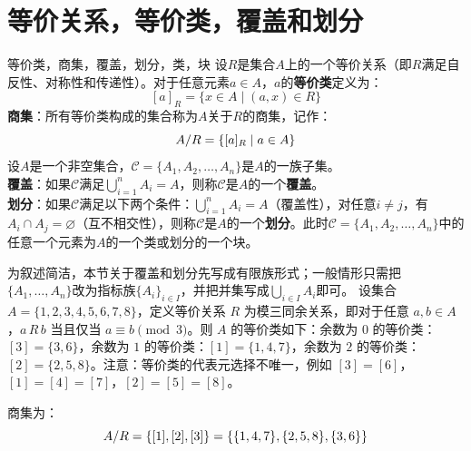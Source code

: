 \section{等价关系，等价类，覆盖和划分}
\begin{definition}{等价类，商集，覆盖，划分，类，块}{}
设$R$是集合$A$上的一个等价关系（即$R$满足自反性、对称性和传递性）。对于任意元素$a \in A$，$a$的\textbf{等价类}定义为：\vspace{-10pt}
\[
[a]_R = \{x \in A \mid (a,x) \in R\}
\]
\textbf{商集}：所有等价类构成的集合称为$A$关于$R$的商集，记作：\vspace{-5pt}
\[
A/R = \{[a]_R \mid a \in A\}\vspace{-5pt}
\]
设$A$是一个非空集合，$\mathcal{C} = \{A_1, A_2, \ldots, A_n\}$是$A$的一族子集。\\
\textbf{覆盖}：如果$\mathcal{C}$满足$\bigcup_{i=1}^{n} A_i = A$，则称$\mathcal{C}$是$A$的一个\textbf{覆盖}。\\
\textbf{划分}：如果$\mathcal{C}$满足以下两个条件：$\bigcup_{i=1}^{n} A_i = A$（覆盖性），对任意$i \neq j$，有$A_i \cap A_j = \varnothing$（互不相交性），则称$\mathcal{C}$是$A$的一个\textbf{划分}。此时$\mathcal{C} = \{A_1, A_2, \ldots, A_n\}$中的任意一个元素为$A$的一个类或划分的一个块。
\end{definition}
为叙述简洁，本节关于覆盖和划分先写成有限族形式；一般情形只需把$\{A_1,\ldots,A_n\}$改为指标族$\{A_i\}_{i\in I}$，并把并集写成$\bigcup_{i\in I}A_i$即可。
设集合 $A = \{1, 2, 3, 4, 5, 6, 7, 8\}$，定义等价关系 $R$ 为模三同余关系，即对于任意 $a, b \in A$，$a \, R \, b$ 当且仅当 $a \equiv b \pmod{3}$。则 $A$ 的等价类如下：余数为 $0$ 的等价类：$[3] = \{3, 6\}$，余数为 $1$ 的等价类：$[1] = \{1, 4, 7\}$，余数为 $2$ 的等价类：$[2] = \{2, 5, 8\}$。注意：等价类的代表元选择不唯一，例如 $[3] = [6]$，$[1] = [4] = [7]$，$[2] = [5] = [8]$。

商集为：\vspace{-5pt}
\[
A/R = \{[1], [2], [3]\} = \{\{1,4,7\}, \{2,5,8\}, \{3,6\}\}\vspace{-5pt}
\]

